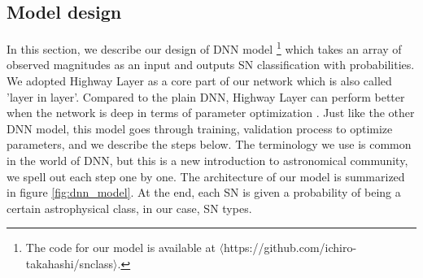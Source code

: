 \documentclass[useamsfonts]{pasj01}
\begin{document}
\subsection{Model design}
\label{sec:model} %
In this section, we describe our design of DNN model
\footnote{The code for our model is available at $\langle$https://github.com/ichiro-takahashi/snclass$\rangle$.}
which takes an array of observed magnitudes as an input and outputs SN classification with probabilities.  We adopted Highway Layer \citep{srivastava15a} as a core part of our network which is also called 'layer in layer'.  Compared to the plain DNN, Highway Layer can perform better when the network is deep in terms of parameter optimization \citep{srivastava15b}.   
Just like the other DNN model, this model goes through training, validation process to optimize parameters, and we describe the steps below.  The terminology we use is common in the world of DNN, but this is a new introduction to astronomical community, we spell out each step one by one.  The architecture of our model is summarized in figure \ref{fig:dnn_model}.
At the end, each SN is given a probability of being a certain astrophysical class, in our case, SN types. 
%
\end{document}
